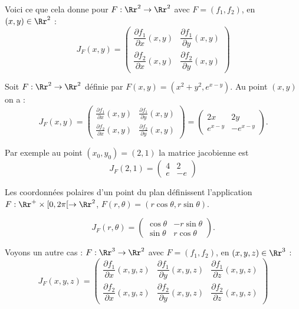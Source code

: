 \documentclass[12pt, class=report,crop=false]{standalone}
\begin{document}
\bigskip

Voici ce que cela donne pour $F : \Rr^2 \to \Rr^2$ avec $F = (f_1,f_2)$, en $(x,y) \in \Rr^2$ :
$$
J_F(x,y) = 
\begin{pmatrix}
\dfrac{\partial f_1}{\partial x} (x,y) & \dfrac{\partial f_1}{\partial y} (x,y) \\
\dfrac{\partial f_2}{\partial x} (x,y) & \dfrac{\partial f_2}{\partial y} (x,y)
\end{pmatrix}
$$

\begin{exemple}
Soit $F : \Rr^2 \to \Rr^2$ définie par $F(x,y) = (x^2 + y^2 , e^{x-y})$.
Au point $(x,y)$ on a :
$$
J_F(x,y) = 
\begin{pmatrix}
\frac{\partial f_1}{\partial x} (x,y) & \frac{\partial f_1}{\partial y} (x,y) \\
\frac{\partial f_2}{\partial x} (x,y) & \frac{\partial f_2}{\partial y} (x,y)
\end{pmatrix}
= 
\begin{pmatrix}
2x & 2y \\
e^{x-y} & -e^{x-y} 
\end{pmatrix}.
$$

Par exemple au point $(x_0,y_0)=(2,1)$ la matrice jacobienne est
$$J_F(2,1) = 
\begin{pmatrix}
4 & 2 \\ e & -e 
\end{pmatrix}$$
\end{exemple}

\begin{exemple}
Les coordonnées polaires d'un point du plan définissent l'application
$F : \Rr^+\times [0,2\pi[\to \Rr^2$, $F(r,\theta) = (r\cos \theta ,r\sin \theta )$.

$$J_F (r,\theta) 
= \begin{pmatrix}
\cos \theta &-r\sin \theta \\
\sin \theta &r\cos \theta 
\end{pmatrix}.$$

\end{exemple}

\bigskip
Voyons un autre cas : $F : \Rr^3 \to \Rr^2$ avec $F = (f_1,f_2)$, en $(x,y,z) \in \Rr^3$ :
$$
J_F(x,y,z) = 
\begin{pmatrix}
\dfrac{\partial f_1}{\partial x} (x,y,z) & \dfrac{\partial f_1}{\partial y} (x,y,z) & \dfrac{\partial f_1}{\partial z} (x,y,z) 
\\
\dfrac{\partial f_2}{\partial x} (x,y,z) & \dfrac{\partial f_2}{\partial y} (x,y,z) & \dfrac{\partial f_2}{\partial z} (x,y,z)
\end{pmatrix}
$$
\end{document}
